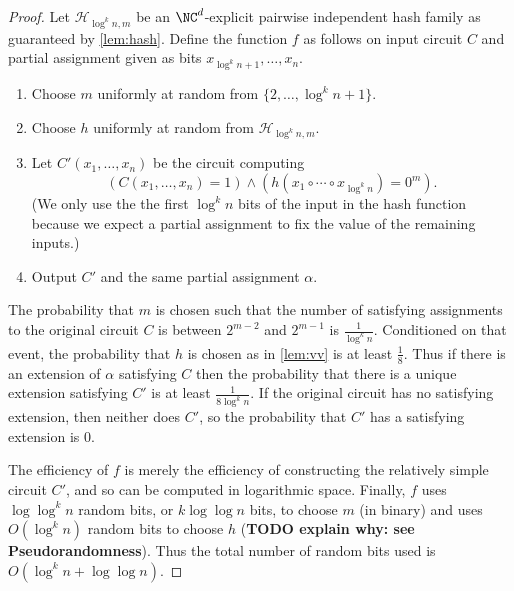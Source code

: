 \documentclass{article}
\begin{document}
\begin{proof}
  Let $\mathcal{H}_{\log^k n, m}$ be an $\NC^d$-explicit pairwise independent hash family as guaranteed by \autoref{lem:hash}.
  Define the function $f$ as follows on input circuit $C$ and partial assignment given as bits $x_{\log^k n + 1}, \dotsc, x_n$.
  \begin{enumerate}
  \item Choose $m$ uniformly at random from $\{2, \dotsc, \log^k n + 1\}$.
  \item Choose $h$ uniformly at random from $\mathcal{H}_{\log^k n, m}$.
  \item
    Let $C'(x_1, \dotsc, x_n)$ be the circuit computing
    \begin{equation*}
      (C(x_1, \dotsc, x_n) = 1) \land (h(x_1 \circ \dotsb \circ x_{\log^k n}) = 0^m).
    \end{equation*}
    (We only use the the first $\log^k n$ bits of the input in the hash function because we expect a partial assignment to fix the value of the remaining inputs.)
  \item Output $C'$ and the same partial assignment $\alpha$.
  \end{enumerate}
  The probability that $m$ is chosen such that the number of satisfying assignments to the original circuit $C$ is between $2^{m - 2}$ and $2^{m - 1}$ is $\frac{1}{\log^k n}$.
  Conditioned on that event, the probability that $h$ is chosen as in \autoref{lem:vv} is at least $\frac{1}{8}$.
  Thus if there is an extension of $\alpha$ satisfying $C$ then the probability that there is a unique extension satisfying $C'$ is at least $\frac{1}{8 \log^k n}$.
  If the original circuit has no satisfying extension, then neither does $C'$, so the probability that $C'$ has a satisfying extension is 0.

  The efficiency of $f$ is merely the efficiency of constructing the relatively simple circuit $C'$, and so can be computed in logarithmic space.
  Finally, $f$ uses $\log \log^k n$ random bits, or $k \log \log n$ bits, to choose $m$ (in binary) and uses $O(\log^k n)$ random bits to choose $h$ (\textbf{TODO explain why: see Pseudorandomness}).
  Thus the total number of random bits used is $O(\log^k n + \log \log n)$.
\end{proof}
\end{document}
